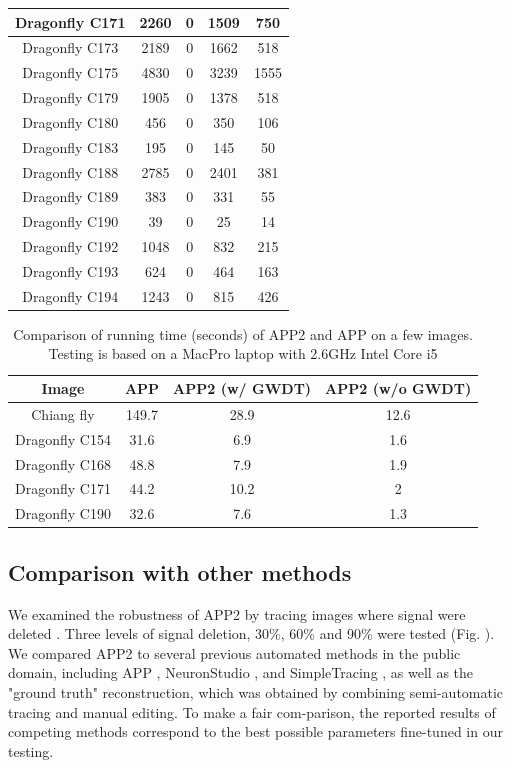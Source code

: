 \begin{table}
\begin{center}
\begin{tabular}{ccccc}
Dragonfly C171 &	2260 &	0 &	1509 &	750\\ \hline
Dragonfly C173 &	2189 &	0 &	1662 &	518\\ \hline
Dragonfly C175 &	4830 &	0 &	3239 &	1555\\ \hline
Dragonfly C179 &	1905 &	0 &	1378 &	518\\ \hline
Dragonfly C180 &	456	& 0	& 350 &	106\\ \hline
Dragonfly C183 &	195	& 0	& 145 &	50\\ \hline
Dragonfly C188 &	2785 &	0 &	2401 &	381\\ \hline
Dragonfly C189 &	383	& 0	& 331 &	55\\ \hline
Dragonfly C190 &	39	& 0	& 25 &	14\\ \hline
Dragonfly C192 &	1048 &	0 &	832 &	215\\ \hline
Dragonfly C193 &	624	& 0	& 464 &	163\\ \hline
Dragonfly C194 &	1243 &	0 &	815 &	426\\ \hline
    \end{tabular}
\end{center}
\end{table}

\begin{table} \label{tab:autont-tab2}
\caption{Comparison of running time (seconds) of APP2 and APP on a few images. Testing is based on a MacPro laptop with 2.6GHz Intel Core i5}
\begin{center}
\begin{tabular}{cccc}
\hline
Image	& APP &	APP2 (w/ GWDT)	& APP2 (w/o GWDT) \\ \hline
Chiang fly & 149.7 &	28.9 &	12.6 \\ \hline
Dragonfly C154 &	31.6 &	6.9 &	1.6 \\ \hline
Dragonfly C168 &	48.8 &	7.9	& 1.9 \\ \hline
Dragonfly C171 &	44.2 &	10.2 &	2 \\ \hline
Dragonfly C190 &	32.6 &	7.6	& 1.3 \\ \hline
\end{tabular}
\end{center}
\end{table}

\subsection{Comparison with other methods}
We examined the robustness of APP2 by tracing images where signal were deleted \cite{peng2010automatic}. Three levels of signal deletion, 30\%, 60\% and 90\% were tested (Fig. \cite{fig:autont-fig3}). We compared APP2 to several previous automated methods in the public domain, including APP \cite{peng2011automatic}, NeuronStudio \cite{rodriguez2008automated}, and SimpleTracing \cite{yang2013distance} , as well as the "ground truth" reconstruction, which was obtained by combining semi-automatic tracing and manual editing. To make a fair com-parison, the reported results of competing methods correspond to the best possible parameters fine-tuned in our testing. 

